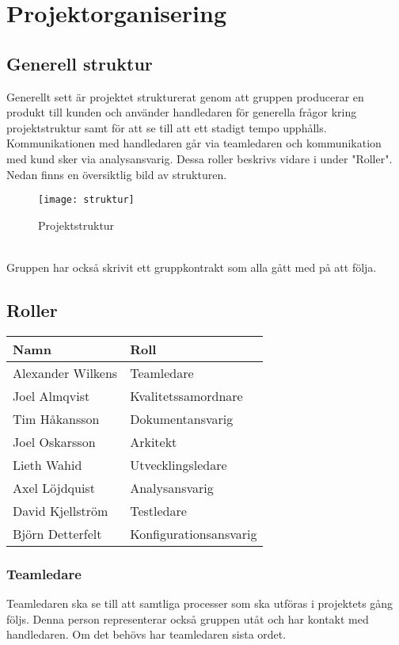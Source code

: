 \section{Projektorganisering}
\subsection{Generell struktur}
Generellt sett är projektet strukturerat genom att gruppen producerar en produkt till kunden och använder handledaren för generella frågor kring projektstruktur samt för att se till att ett stadigt tempo upphålls. Kommunikationen med handledaren går via teamledaren och kommunikation med kund sker via analysansvarig. Dessa roller beskrivs vidare i under "Roller". Nedan finns en översiktlig bild av strukturen.
\begin{figure}[h]
    \centering
    \texttt{[image: struktur]}
    \caption{Projektstruktur}
    \label{fig:struktur}
\end{figure}\\
Gruppen har också skrivit ett gruppkontrakt\cite{bib-gruppkontrakt} som alla gått med på att följa.


\subsection{Roller}
\begin{center}
    \begin{tabular}{| l | l |}
        \hline
        \textbf{Namn} & \textbf{Roll} \\
        \hline
        \centering Alexander Wilkens & Teamledare\\
        \hline
        \centering Joel Almqvist & Kvalitetssamordnare\\
        \hline
        \centering Tim Håkansson & Dokumentansvarig\\
        \hline
        \centering Joel Oskarsson & Arkitekt\\
        \hline
        \centering Lieth Wahid & Utvecklingsledare\\
        \hline
        \centering Axel Löjdquist & Analysansvarig\\
        \hline
        \centering David Kjellström & Testledare\\
        \hline
        \centering Björn Detterfelt & Konfigurationsansvarig\\
        \hline
    \end{tabular}
\end{center}
\subsubsection*{Teamledare}
Teamledaren ska se till att samtliga processer som ska utföras i projektets gång följs. Denna person representerar också gruppen utåt och har kontakt med handledaren. Om det behövs har teamledaren sista ordet.

